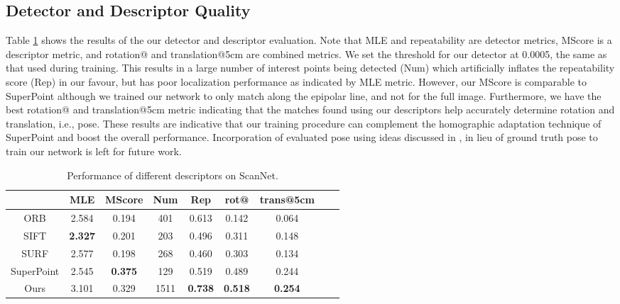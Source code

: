 \documentclass[runningheads]{llncs}
\begin{document}
\subsection{Detector and Descriptor Quality}
Table \ref{table1} shows the results of the our detector and descriptor evaluation. Note that MLE and repeatability are detector metrics, MScore is a descriptor metric, and rotation@  and translation@5cm are combined metrics. We set the threshold for our detector at 0.0005, the same as that used during training. This results in a large number of interest points being detected (Num) which artificially inflates the repeatability score (Rep) in our favour, but has poor localization performance as indicated by MLE metric. However, our MScore is comparable to SuperPoint although we trained our network to only match along the epipolar line, and not for the full image. Furthermore, we have the best rotation@ and translation@5cm metric indicating that the matches found using our descriptors help accurately determine rotation and translation, i.e., pose. These results are indicative that our training procedure can complement the homographic adaptation technique of SuperPoint and boost the overall performance. Incorporation of evaluated pose using ideas discussed in \cite{sarlin2019superglue}, in lieu of ground truth pose to train our network is left for future work.   
\begin{table}
  \caption{Performance of different descriptors on ScanNet.}
  \centering
\begin{tabular}{ccccccccc}
  \hline
&\textbf{MLE}  &\textbf{MScore} & \textbf{Num} & \textbf{Rep}& \textbf{rot@}& \textbf{trans@5cm}\\

    \hline
ORB  &	2.584 &		0.194  &   401  & 0.613 &  0.142 &		0.064	 \\
SIFT &	\textbf{2.327} &		0.201  &   203  & 0.496 &  0.311 &		0.148	\\
SURF &	2.577 &		0.198  &   268  & 0.460 &  0.303 &		0.134	\\
SuperPoint  &  2.545 &     \textbf{0.375}  &   129  & 0.519	&  0.489 &      0.244 \\
Ours &	 3.101 &   0.329   &  1511  & \textbf{0.738} &  \textbf{0.518} &\textbf{0.254} 	\\
\hline
  \end{tabular}
  \label{table1}
\end{table}
\end{document}
